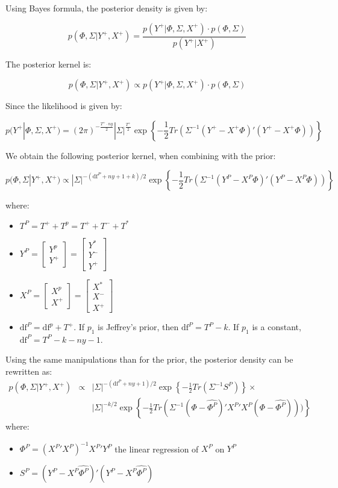 \documentclass[10pt,a4paper]{article}
\newcommand{\df}{\text{df}}
\begin{document}
Using Bayes formula, the posterior density is given by:

\begin{equation}
\label{bayes-formula}
p(\Phi, \Sigma | Y^+, X^+) = \frac{p(Y^+ | \Phi, \Sigma, X^+) \cdot p(\Phi, \Sigma)}{p(Y^+ | X^+)}
\end{equation}

The posterior kernel is:

$$p(\Phi, \Sigma | Y^+, X^+) \propto p(Y^+ | \Phi, \Sigma, X^+) \cdot p(\Phi, \Sigma)$$

Since the likelihood is given by:

$$p(Y^+ | \Phi, \Sigma, X^+) = (2\pi)^{-\frac{T^+ \cdot ny}{2}} |\Sigma|^{\frac{T^+}{2}} \exp\left\{-\frac{1}{2}Tr(\Sigma^{-1}(Y^+-X^+\Phi)'(Y^+-X^+\Phi))\right\}$$

We obtain the following posterior kernel, when combining with the prior:

$$p(\Phi, \Sigma | Y^+, X^+) \propto  |\Sigma|^{-(\df^P + ny + 1 + k)/2} \exp\left\{-\frac{1}{2}Tr(\Sigma^{-1}(Y^P-X^P\Phi)'(Y^P-X^P\Phi))\right\}$$

where:
\begin{itemize}
\item $T^P = T^+ + T^p = T^+ + T^- + T^*$
\item $Y^P = \left[
\begin{array}{c}
Y^p \\
Y^+
\end{array}
\right]
= \left[
\begin{array}{c}
Y^* \\
Y^- \\
Y^+
\end{array}
\right]$
\item $X^P = \left[
\begin{array}{c}
X^p \\
X^+
\end{array}
\right]
= \left[
\begin{array}{c}
X^* \\
X^- \\
X^+
\end{array}
\right]$
\item $\df^P = \df^p + T^+$. If $p_1$ is Jeffrey's prior, then $\df^P = T^P - k$. If $p_1$ is a constant, $\df^P = T^P - k - ny - 1$.
\end{itemize}

Using the same manipulations than for the prior, the posterior density can be rewritten as:
\begin{eqnarray*}
p(\Phi, \Sigma | Y^+, X^+) & \propto & |\Sigma|^{-(\df^P + ny + 1)/2} \exp\left\{-\frac{1}{2}Tr(\Sigma^{-1}S^P)\right\} \times \\
& & |\Sigma|^{-k/2}\exp\left\{-\frac{1}{2}Tr(\Sigma^{-1}(\Phi-\hat{\Phi^P})'{X^P}'X^P(\Phi-\hat{\Phi^P})))\right\}
\end{eqnarray*}
where:
\begin{itemize}
\item $\hat{\Phi^P} = ({X^P}'X^P)^{-1} {X^P}' Y^P$ the linear regression of $X^P$ on $Y^P$
\item $S^P = (Y^P - X^P\hat{\Phi^P})'(Y^P - X^P\hat{\Phi^P})$
\end{itemize}
\end{document}
